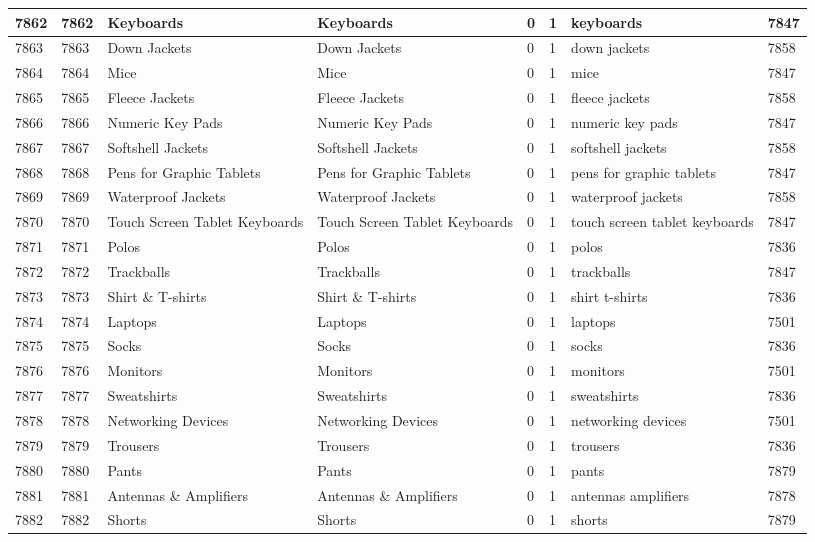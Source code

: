 \begin{longtable}{|l|l|l|l|l|l|l|l|}
7862 & 7862 & Keyboards & Keyboards & 0 & 1 & keyboards & 7847 \\ \hline 
7863 & 7863 & Down Jackets & Down Jackets & 0 & 1 & down jackets & 7858 \\ \hline 
7864 & 7864 & Mice & Mice & 0 & 1 & mice & 7847 \\ \hline 
7865 & 7865 & Fleece Jackets & Fleece Jackets & 0 & 1 & fleece jackets & 7858 \\ \hline 
7866 & 7866 & Numeric Key Pads & Numeric Key Pads & 0 & 1 & numeric key pads & 7847 \\ \hline 
7867 & 7867 & Softshell Jackets & Softshell Jackets & 0 & 1 & softshell jackets & 7858 \\ \hline 
7868 & 7868 & Pens for Graphic Tablets & Pens for Graphic Tablets & 0 & 1 & pens for graphic tablets & 7847 \\ \hline 
7869 & 7869 & Waterproof Jackets & Waterproof Jackets & 0 & 1 & waterproof jackets & 7858 \\ \hline 
7870 & 7870 & Touch Screen Tablet Keyboards & Touch Screen Tablet Keyboards & 0 & 1 & touch screen tablet keyboards & 7847 \\ \hline 
7871 & 7871 & Polos & Polos & 0 & 1 & polos & 7836 \\ \hline 
7872 & 7872 & Trackballs & Trackballs & 0 & 1 & trackballs & 7847 \\ \hline 
7873 & 7873 & Shirt \& T-shirts & Shirt \& T-shirts & 0 & 1 & shirt t-shirts & 7836 \\ \hline 
7874 & 7874 & Laptops & Laptops & 0 & 1 & laptops & 7501 \\ \hline 
7875 & 7875 & Socks & Socks & 0 & 1 & socks & 7836 \\ \hline 
7876 & 7876 & Monitors & Monitors & 0 & 1 & monitors & 7501 \\ \hline 
7877 & 7877 & Sweatshirts & Sweatshirts & 0 & 1 & sweatshirts & 7836 \\ \hline 
7878 & 7878 & Networking Devices & Networking Devices & 0 & 1 & networking devices & 7501 \\ \hline 
7879 & 7879 & Trousers & Trousers & 0 & 1 & trousers & 7836 \\ \hline 
7880 & 7880 & Pants & Pants & 0 & 1 & pants & 7879 \\ \hline 
7881 & 7881 & Antennas \& Amplifiers & Antennas \& Amplifiers & 0 & 1 & antennas amplifiers & 7878 \\ \hline 
7882 & 7882 & Shorts & Shorts & 0 & 1 & shorts & 7879 \\ \hline 

\end{longtable}
